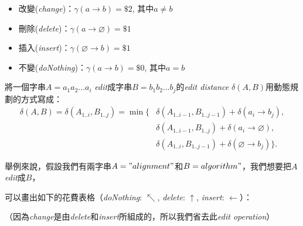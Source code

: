 \documentclass[15pt]{extarticle}
\begin{document}
\begin{itemize}
    \item 改變(\textit{change})：$\gamma(a\to b)=\$2$, 其中$a\ne b$
    \item 刪除(\textit{delete})：$\gamma(a\to\varnothing)=\$1$
    \item 插入(\textit{insert})：$\gamma(\varnothing\to b)=\$1$
    \item 不變(\textit{doNothing})：$\gamma(a\to b)=\$0$, 其中$a=b$
\end{itemize}

將一個字串$A=a_1a_2\dots a_i$ \textit{edit}成字串$B=b_1b_2\dots b_j$的\textit{edit distance} $\delta(A,B)$用動態規劃的方式寫成：
\begin{align*}
    \delta(A,B)=\delta(A_{1..i},B_{1..j}) = \min\{& \delta(A_{1..i-1},B_{1..j-1})+\delta(a_i\to b_j), \\
    & \delta(A_{1..i-1},B_{1..j})+\delta(a_i\to\varnothing), \\
    & \delta(A_{1..i},B_{1..j-1})+\delta(\varnothing\to b_j)\}.
\end{align*}

舉例來說，假設我們有兩字串$A="alignment"$和$B=
algorithm"$，我們想要把$A$ \textit{edit}成$B$，

可以畫出如下的花費表格（\textit{doNothing}: $\nwarrow$, \textit{delete}: $\uparrow$, \textit{insert}: $\leftarrow$）：

（因為\textit{change}是由\textit{delete}和\textit{insert}所組成的，所以我們省去此\textit{edit operation}）
\end{document}

